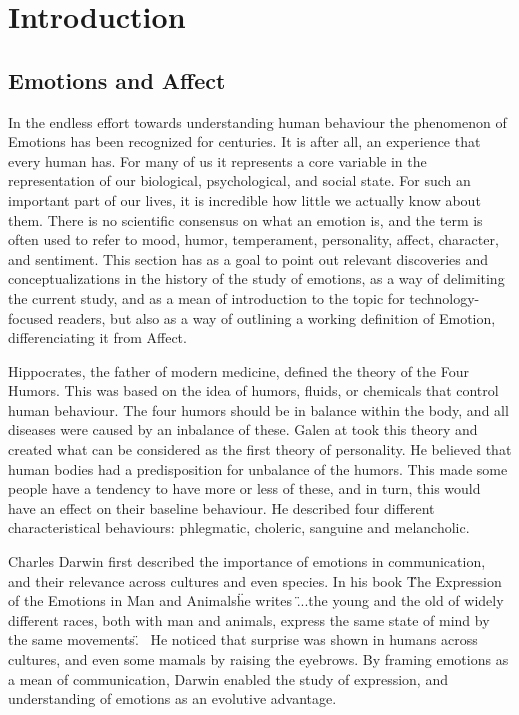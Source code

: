 \chapter{Introduction}\label{chap:Introduction}

\section{Emotions and Affect}\label{sec:Emotions and Affect}

In the endless effort towards understanding human behaviour the phenomenon of Emotions has been recognized for centuries. It is after all, an experience that every human has. For many of us it represents a core variable in the representation of our biological, psychological, and social state. For such an important part of our lives, it is incredible how little we actually know about them. There is no scientific consensus on what an emotion is, and the term is often used to refer to mood, humor, temperament, personality, affect, character, and sentiment.
This section has as a goal to point out relevant discoveries and conceptualizations in the history of the study of emotions, as a way of delimiting the current study, and as a mean of introduction to the topic for technology-focused readers, but also as a way of outlining a working definition of Emotion, differenciating it from Affect.

Hippocrates, the father of modern medicine, defined the theory of the Four Humors.
This was based on the idea of humors, fluids, or chemicals that control human behaviour.
The four humors should be in balance within the body, and all diseases were caused by an inbalance of these.\cite{kalachanis2015hippocratic}
Galen at took this theory and created what can be considered as the first theory of personality. He believed that human bodies had a predisposition for unbalance of the humors. This made some people have a tendency to have more or less of these, and in turn, this would have an effect on their baseline behaviour. He described four different characteristical behaviours: phlegmatic, choleric, sanguine and melancholic.\cite{irwin1947galen}

Charles Darwin first described the importance of emotions in communication, and their relevance across cultures and even species. In his book \"The Expression of the Emotions in Man and Animals\" he writes \"...the young and the old of widely different races, both with man and animals, express the same state of mind by the same movements.\"~\cite{darwin1872emotions} He noticed that surprise was shown in humans across cultures, and even some mamals by raising the eyebrows. By framing emotions as a mean of communication, Darwin enabled the study of expression, and understanding of emotions as an evolutive advantage.

